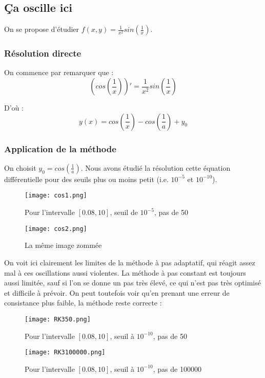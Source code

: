 \documentclass[a4paper, titlepage]{livret} %
\begin{document}
			\subsection{Ça oscille ici}
				On se propose d'étudier $f(x,y) = \frac{1}{x^{2}}sin\left(\frac{1}{x}\right)$.

				\subsubsection{Résolution directe}
					On commence par remarquer que :
					\[
						\left(cos(\dfrac{1}{x})\right)' = \frac{1}{x^{2}}sin\left(\frac{1}{x}\right)
					\]

					D'où :
					\[
						y(x) = cos\left(\frac{1}{x}\right) - cos\left(\frac{1}{a}\right) + y_0
					\]

				\subsubsection{Application de la méthode}
					On choisit $y_0 = cos(\frac{1}{a})$.
					Nous avons étudié la résolution cette équation différentielle pour des seuils plus ou moins petit (i.e. $10^{-5}$ et $10^{-10}$).

					\begin{figure}[!h]
						\centering
  							\texttt{[image: cos1.png]}
  							\caption{Pour l'intervalle $[0.08,10]$, seuil de $10^{-5}$, pas de 50}
					\end{figure}
	
					\begin{figure}[!h]
						\centering
  							\texttt{[image: cos2.png]}
  							\caption{La même image zommée}
					\end{figure}
					\newpage

					On voit ici clairement les limites de la méthode à pas adaptatif, qui réagit assez mal à ces oscillations aussi violentes.
					La méthode à pas constant est toujours aussi limitée, sauf si l'on se donne un pas très élevé, ce qui n'est pas très optimisé et difficile à prévoir.
					On peut toutefois voir qu'en prenant une erreur de consistance plus faible, la méthode reste correcte :
	
					\begin{figure}[!h]
						\centering
  							\texttt{[image: RK350.png]}
  							\caption{Pour l'intervalle $[0.08,10]$, seuil à $10^{-10}$, pas de 50}
					\end{figure}
	
					\begin{figure}[!h]
						\centering
  							\texttt{[image: RK3100000.png]}
  							\caption{Pour l'intervalle $[0.08,10]$, seuil à $10^{-10}$, pas de 100000}
					\end{figure}
					\newpage
\end{document}
